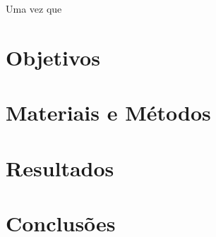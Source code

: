 \documentclass[a4paper,11pt]{article}
\begin{document}
    Uma vez que
    \section{Objetivos}
    \section{Materiais e Métodos}
    \section{Resultados}
    \section{Conclusões}


    
    
\end{document}
